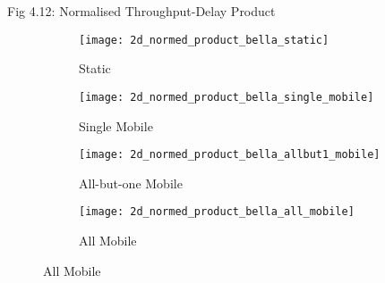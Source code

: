 \documentclass[aspectratio=169]{beamer}
\begin{document}
\begin{frame}{Fig 4.12: Normalised Throughput-Delay Product}
	\begin{figure}[h]
		\begin{subfigure}[t]{0.3\textwidth}
			\centering
			\texttt{[image: 2d\_normed\_product\_bella\_static]}
			\caption{Static}
			\label{fig:2d_normed_product_bella_static}
		\end{subfigure}
		\begin{subfigure}[t]{0.3\textwidth}
			\centering
			\texttt{[image: 2d\_normed\_product\_bella\_single\_mobile]}
			\caption{Single Mobile}
			\label{fig:2d_normed_product_bella_single_mobile}
		\end{subfigure}
		
		\begin{subfigure}[t]{0.3\textwidth}
			\centering
			\texttt{[image: 2d\_normed\_product\_bella\_allbut1\_mobile]}
			\caption{All-but-one Mobile}
			\label{fig:2d_normed_product_bella_allbut1_mobile}
		\end{subfigure}
		\begin{subfigure}[t]{0.3\textwidth}
			\centering
			\texttt{[image: 2d\_normed\_product\_bella\_all\_mobile]}
			\caption{All Mobile}
			\label{fig:2d_normed_product_bella_all_mobile}
		\end{subfigure}
		\label{fig:2d_normed_product}
	\end{figure}
\end{frame}
\end{document}
